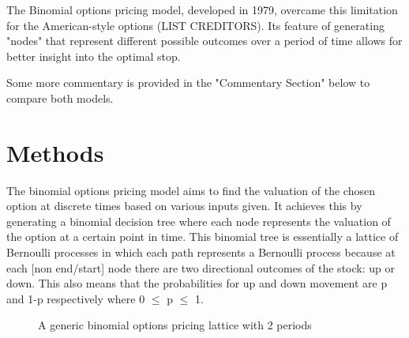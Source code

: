 \documentclass[12pt, letterpaper]{article}
\begin{document}
The Binomial options pricing model, developed in 1979, overcame this limitation for the American-style options (LIST CREDITORS).
Its feature of generating "nodes" that represent different possible outcomes over a period of time allows for better insight into the optimal stop.

Some more commentary is provided in the "Commentary Section" below to compare both models.

\pagebreak

\section*{Methods}

The binomial options pricing model aims to find the valuation of the chosen option at discrete times based on various inputs given.
It achieves this by generating a binomial decision tree where each node represents the valuation of the option at a certain point in time.
This binomial tree is essentially a lattice of Bernoulli processes in which each path represents a Bernoulli process because at each [non end/start] node there are two directional outcomes of the stock: up or down.
This also means that the probabilities for up and down movement are p and 1-p respectively where 0 $\leq$ p $\leq$ 1.

\begin{figure}
  \centering
  \caption{A generic binomial options pricing lattice with 2 periods}
\end{figure}
\end{document}
